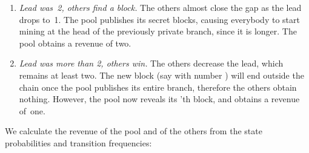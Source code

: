 \documentclass[letterpaper]{llncs}
\begin{document}
\begin{enumerate}[label=(\alph*)]
\vspace{0.5\baselineskip}

\item \emph{Lead was~2, others find a block.} The others almost close the gap as the lead drops to~1. The pool publishes its secret blocks, causing everybody to start mining at the head of the previously private branch, since it is longer. The pool obtains a revenue of two. \label{itm:others2}

\vspace{0.5\baselineskip}

\centerline{
    {\Large \hspace{0.0cm}  \hspace{0.0cm}}
    {\Large \hspace{0.0cm}  \hspace{0.0cm}}
}

\vspace{0.5\baselineskip}

\item \emph{Lead was more than 2, others win.} The others decrease the lead, which remains at least two. The new block (say with number ) will end outside the chain once the pool publishes its entire branch, therefore the others obtain nothing. However, the pool now reveals its 'th block, and obtains a revenue of~one. \label{itm:others3}

\vspace{0.5\baselineskip}

\centerline{
    {\Large \hspace{0.0cm}  \hspace{0.0cm}}
    {\Large \hspace{0.0cm}  \hspace{0.0cm}}
}

\vspace{0.5\baselineskip}

\end{enumerate} 

We calculate the revenue of the pool and of the others from the state probabilities and transition frequencies: 
 
\end{document}
